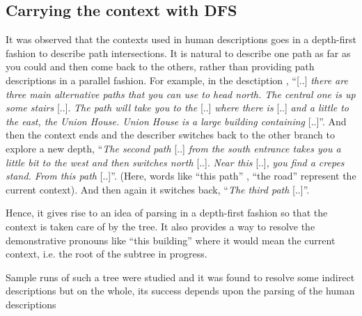 \documentclass{article}
\begin{document}
\subsection*{Carrying the context with DFS}

It was observed that the contexts used in human descriptions goes in a
depth-first fashion to describe path intersections. It is natural to
describe one path as far as you could and then come back to the others,
rather than providing path descriptions in a parallel fashion. For
example, in the desctiption , ``{[}..{]} \textit{there are three main
alternative paths that you can use to head north. The central one is up
some stairs} {[}..{]}. \textit{The path will take you to the} {[}..{]} \textit{where there
is} {[}..{]} \textit{and a little to the east, the Union House. Union House is a
large building containing} {[}..{]}''. And then the context ends and the
describer switches back to the other branch to explore a new depth,
``\textit{The second path} {[}..{]} \textit{from the south entrance takes you a little
bit to the west and then switches north} {[}..{]}. \textit{Near this} {[}..{]},
\textit{you find a crepes stand. From this path }{[}..{]}''. (Here, words like
``this path'' , ``the road'' represent the current context). And then
again it switches back, ``\textit{The third path} {[}..{]}''.

Hence, it gives rise to an idea of parsing in a depth-first fashion so
that the context is taken care of by the tree. It also provides a way to
resolve the demonstrative pronouns like ``this building'' where it would
mean the current context, i.e. the root of the subtree in progress.

Sample runs of such a tree were studied and it was found to resolve some
indirect descriptions but on the whole, its success depends upon the
parsing of the human descriptions
\end{document}
